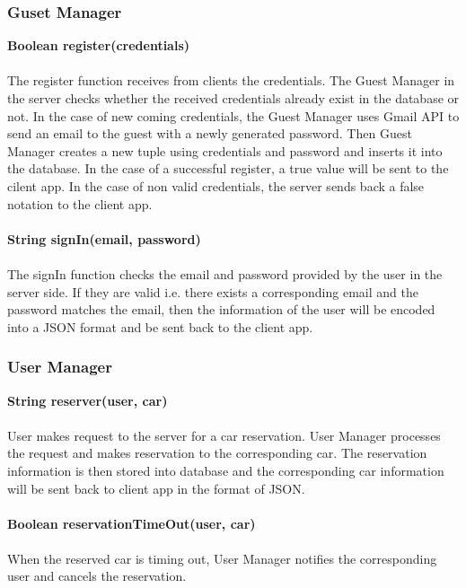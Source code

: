 \documentclass{article}
\begin{document}
	\subsubsection{Guset Manager}
	\textbf{Boolean register(credentials)}
	\\
	\\The register function receives from clients the credentials. The Guest Manager in the server checks whether the received credentials already exist in the database or not. In the case of new coming credentials, the Guest Manager uses Gmail API to send an email to the guest with a newly generated password. Then Guest Manager creates a new tuple using credentials and password and inserts it into the database. In the case of a successful register, a true value will be sent to the cilent app.  In the case of non valid credentials, the server sends back a false notation to the client app.
	\\
	\\\textbf{String signIn(email, password)}
	\\
	\\The signIn function checks the email and password provided by the user in the server side. If they are valid i.e. there exists a corresponding email and the password matches the email, then the information of the user will be encoded into a JSON format and be sent back to the client app. 
	
	\subsubsection{User Manager}
	\textbf{String reserver(user, car)}
	\\
	\\User makes request to the server for a car reservation. User Manager processes the request and makes reservation to the corresponding car.  The reservation information is then stored into database and the corresponding car information will be sent back to client app in the format of JSON.
	\\
	\\\textbf{Boolean reservationTimeOut(user, car)}
	\\
	\\When the reserved car is timing out, User Manager notifies the corresponding user and cancels the reservation.
	
\end{document}
